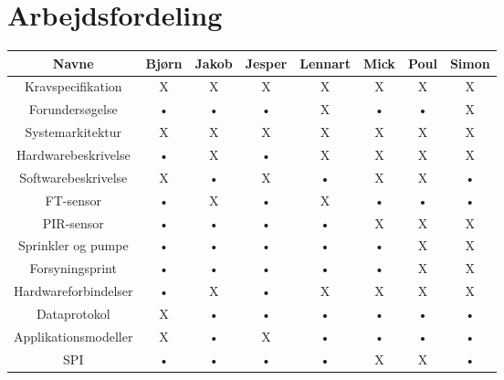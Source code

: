 \chapter*{Arbejdsfordeling}

\begin{tabular}{|c|c|c|c|c|c|c|c|}
\hline 
\textbf{Navne} 		& Bjørn 	& Jakob 	& Jesper 	& Lennart 	& Mick 	& Poul 	& Simon \\ 
\hline 
Kravspecifikation 	& X 		& X 		& X 			& X 			& X 		& X 		& X \\ 
\hline 
Forundersøgelse 		& • 		& • 		& • 			& X 			& • 		& • 		& X \\ 
\hline 
Systemarkitektur 	& X 		& X 		& X 			& X 			& X 		& X 		& X \\ 
\hline 
Hardwarebeskrivelse	& • 		& X 		& • 			& X 			& X 		& X 		& X \\ 
\hline 
Softwarebeskrivelse	& X 		& • 		& X 			& • 			& X 		& X 		& • \\ 
\hline 
FT-sensor			& • 		& X 		& • 			& X 			& • 		& • 		& • \\ 
\hline 
PIR-sensor			& • 		& • 		& • 			& • 			& X 		& X 		& X \\ 
\hline 
Sprinkler og pumpe	& • 		& • 		& • 			& • 			& • 		& X 		& X \\ 
\hline 
Forsyningsprint		& • 		& • 		& • 			& • 			& • 		& X		& X \\ 
\hline 
Hardwareforbindelser	& • 		& X 		& • 			& X 			& X 		& X 		& X \\ 
\hline 
Dataprotokol			& X 		& • 		& • 			& • 			& • 		& • 		& • \\  
\hline 
Applikationsmodeller	& X 		& • 		& X 			& • 			& • 		& • 		& • \\ 
\hline 
SPI					& • 		& • 		& • 			& • 			& X 		& X 		& • \\  
\hline 
\end{tabular} 
